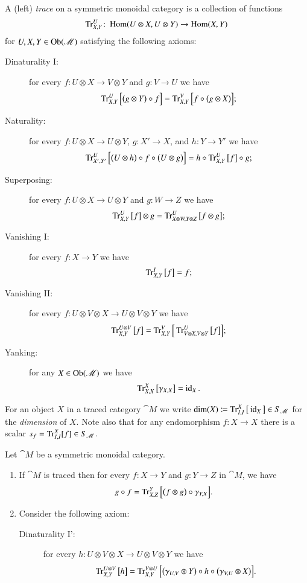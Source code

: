 \documentclass[12pt,oneside,article,draft]{memoir}
\begin{document}
\begin{enumerate}
{A (left) \emph{trace} on a symmetric monoidal category is a collection of functions 
\[\operatorname{Tr}^U_{X,Y}\colon\operatorname{Hom}(U\otimes X,U\otimes Y)\to\operatorname{Hom}(X,Y)\]
for $U,X,Y\in\operatorname{Ob}(\mathscr{M})$ satisfying the following axioms:
\begin{description}
 \item [Dinaturality I:] for every $f\colon U\otimes X\to V\otimes Y$ and $g:V\to U$ we have
 \[\operatorname{Tr}^U_{X,Y}\Big[\big(g\otimes Y\big)\circ f\Big]=\operatorname{Tr}^V_{X,Y}\Big[f\circ\big(g\otimes X\big)\Big];\] 
 \item [Naturality:] for every $f\colon U\otimes X\to U\otimes Y$, $g\colon X'\to X$, and $h\colon Y\to Y'$ we have
 \[\operatorname{Tr}^U_{X',Y'}\Big[\big(U\otimes h\big)\circ f\circ\big(U\otimes g\big)\Big]=h\circ\operatorname{Tr}^U_{X,Y}\big[f\big]\circ g;\]
 \item [Superposing:] for every $f\colon U\otimes X\to U\otimes Y$ and $g\colon W\to Z$ we have
 \[\operatorname{Tr}^U_{X,Y}\big[f\big]\otimes g=\operatorname{Tr}^U_{X\otimes W,Y\otimes Z}\big[f\otimes g\big];\]
 \item [Vanishing I:] for every $f\colon X\to Y$ we have
 \[\operatorname{Tr}^{I}_{X,Y}\big[f\big]=f;\]
 \item [Vanishing II:] for every $f\colon U\otimes V\otimes X\to U\otimes V\otimes Y$ we have
 \[\operatorname{Tr}^{U\otimes V}_{X,Y}\big[f\big]=\operatorname{Tr}^V_{X,Y}\Big[\operatorname{Tr}^U_{V\otimes X,V\otimes Y}\big[f\big]\Big];\]
 \item [Yanking:] for any $X\in\operatorname{Ob}(\mathscr{M})$ we have
 \[\operatorname{Tr}^X_{X,X}\big[\gamma_{X,X}\big]=\operatorname{id}_X.\]
\end{description}
For an object $X$ in a traced category $\cat{M}$ we write $\dim(X)\coloneqq\operatorname{Tr}^X_{I,I}\big[\operatorname{id}_X\big]\in S_{\mathscr{M}}$ for the \emph{dimension} of $X$.
Note also that for any endomorphism $f\colon X\to X$ there is a scalar $s_f=\operatorname{Tr}^X_{I,I}[f]\in S_{\mathscr{M}}$.
\begin{proposition}\label{prop:dinaturality}\mbox{}
Let $\cat{M}$ be a symmetric monoidal category.
\begin{enumerate}
 \item If $\cat{M}$ is traced then for every $f\colon X\to Y$ and $g\colon Y\to Z$ in $\cat{M}$, we have
 \[g\circ f=\operatorname{Tr}^Y_{X,Z}\Big[\big(f\otimes g\big)\circ\gamma_{Y,X}\Big].\]
 \item Consider the following axiom:
 \begin{description}
  \item [Dinaturality I':] for every $h\colon U\otimes V\otimes X\to U\otimes V\otimes Y$ we have
 \[\operatorname{Tr}^{U\otimes V}_{X,Y}\big[h\big]=\operatorname{Tr}^{V\otimes U}_{X,Y}\Big[\big(\gamma_{U,V}\otimes Y\big)\circ h\circ\big(\gamma_{V,U}\otimes X\big)\Big].\]

\end{description}
\end{enumerate}
\end{proposition}}
\end{enumerate}
\end{document}
